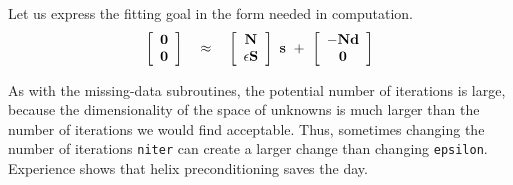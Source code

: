 \par
Let us express the fitting goal in the form needed in computation.
\begin{equation}
                                        \label{eqn:signoireg}
\left[ 
   \begin{array}{c}
           \bold 0  \\
           \bold 0 
           \end{array}
   \right] 
%
\quad\approx\quad
%
\left[ 
   \begin{array}{c}
                    \bold N  \\
           \epsilon \bold S 
          \end{array}
   \right] \ 
                  \bold s
\ +\ 
\left[ 
   \begin{array}{c}
           -\bold N  \bold d  \\
            \bold 0 
           \end{array}
   \right] 
\end{equation}
\par

As with the missing-data subroutines,
the potential number of iterations is large,
because the dimensionality of the space of unknowns
is much larger than the number of iterations we would find acceptable.
Thus,
sometimes changing the number of iterations {\tt niter}
can create a larger change than changing {\tt epsilon}.
Experience shows that helix preconditioning saves the day.

\par

